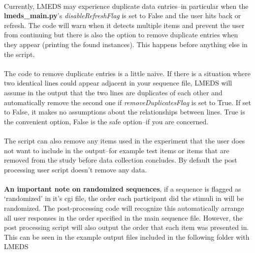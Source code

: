 \paragraph{}
Currently, LMEDS may experience duplicate data entries--in particular when the \textbf{lmeds\_main.py}'s \textit{disableRefreshFlag} is set to False and the user hits back or refresh.  The code will warn when it detects multiple items and prevent the user from continuing but there is also the option to remove duplicate entries when they appear (printing the found instances).  This happens before anything else in the script.

\paragraph{}
\begin{tcolorbox}[colback=white,colframe=red,width=\dimexpr\textwidth+12mm\relax,enlarge left by=-6mm,enlarge right by=6mm]
The code to remove duplicate entries is a little naive.  If there is a situation where two identical lines could appear adjacent in your sequence file, LMEDS will assume in the output that the two lines are duplicates of each other and automatically remove the second one if \textit{removeDuplicatesFlag} is set to True.  If set to False, it makes no assumptions about the relationships between lines.  True is the convenient option, False is the safe option--if you are concerned.
\end{tcolorbox}

\paragraph{}
The script can also remove any items used in the experiment that the user does not want to include in the output--for example test items or items that are removed from the study before data collection concludes.  By default the post processing user script doesn't remove any data.

\paragraph{}
\textbf{An important note on randomized sequences}, if a sequence is flagged as `randomized' in it's cgi file, the order each participant did the stimuli in will be randomized.  The post-processing code will recognize this automatically arrange all user responses in the order specified in the main sequence file.  However, the post processing script will also output the order that each item was presented in.  This can be seen in the example output files included in the following folder with LMEDS

